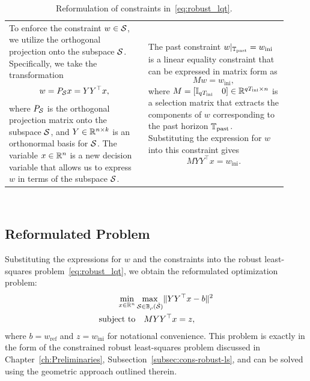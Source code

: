 \begin{table}[h]
    \centering
    \begin{tabular}{p{0.46\linewidth}|p{0.46\linewidth}}
        To enforce the constraint $w \in \mathcal{S}$, we utilize the orthogonal projection onto the subspace $\mathcal{S}$. Specifically, we take the transformation
        \begin{equation}
            w = P_{\mathcal{S}} x = YY^\top x,
        \end{equation}
        where $P_{\mathcal{S}}$ is the orthogonal projection matrix onto the subspace $\mathcal{S}$, and $Y \in \mathbb{R}^{n \times k}$ is an orthonormal basis for $\mathcal{S}$. The variable $x \in \mathbb{R}^n$ is a new decision variable that allows us to express $w$ in terms of the subspace $\mathcal{S}$. & The past constraint $w|_{\mathbb{T}_{\textrm{past}}} = w_{\textrm{ini}}$ is a linear equality constraint that can be expressed in matrix form as
        \begin{equation}
            M w = w_{\textrm{ini}},
        \end{equation}
        where $M = [\mathbb{I}_{q T_{\textrm{ini}}} \quad 0] \in \mathbb{R}^{q T_{\textrm{ini}} \times n}$ is a selection matrix that extracts the components of $w$ corresponding to the past horizon $\mathbb{T}_{\textrm{past}}$.
        Substituting the expression for $w$ into this constraint gives
        \begin{equation}
            M YY^\top x = w_{\textrm{ini}}.
        \end{equation} 
    \end{tabular}
    \caption{Reformulation of constraints in~\eqref{eq:robust_lqt}.}~\label{tab:constraints_reformulation}
\end{table}

\subsection{Reformulated Problem}
Substituting the expressions for $w$ and the constraints into the robust least-squares problem~\eqref{eq:robust_lqt}, we obtain the reformulated optimization problem:
\begin{equation}\label{eq:reformulated_robust_lqt}
    \begin{split}
    \min_{x \in \mathbb{R}^n} & \max_{\mathcal{S} \in \mathbb{B}_{\rho}(\hat{\mathcal{S}})} \lVert YY^\top x - b \rVert^2 \\
    \text{subject to} & \quad M YY^\top x = z,
    \end{split}
\end{equation}
where $b = w_{\textrm{ref}}$ and $z = w_{\textrm{ini}}$ for notational convenience. This problem is exactly in the form of the constrained robust least-squares problem discussed in Chapter~\ref{ch:Preliminaries}, Subsection~\ref{subsec:cons-robust-ls}, and can be solved using the geometric approach outlined therein.

